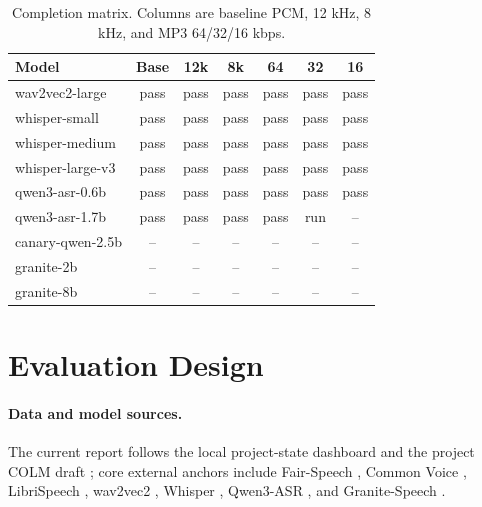 \documentclass[11pt]{article}
\newcommand{\ok}{\textcolor{good}{pass}}
\newcommand{\run}{\textcolor{warn}{run}}
\newcommand{\pend}{\textcolor{muted}{--}}
\begin{document}
\begin{table}[t]
\centering
\scriptsize
\begin{tabular}{@{}lcccccc@{}}
\toprule
Model & Base & 12k & 8k & 64 & 32 & 16 \\
\midrule
wav2vec2-large & \ok & \ok & \ok & \ok & \ok & \ok \\
whisper-small & \ok & \ok & \ok & \ok & \ok & \ok \\
whisper-medium & \ok & \ok & \ok & \ok & \ok & \ok \\
whisper-large-v3 & \ok & \ok & \ok & \ok & \ok & \ok \\
qwen3-asr-0.6b & \ok & \ok & \ok & \ok & \ok & \ok \\
qwen3-asr-1.7b & \ok & \ok & \ok & \ok & \run & \pend \\
canary-qwen-2.5b & \pend & \pend & \pend & \pend & \pend & \pend \\
granite-2b & \pend & \pend & \pend & \pend & \pend & \pend \\
granite-8b & \pend & \pend & \pend & \pend & \pend & \pend \\
\bottomrule
\end{tabular}
\caption{Completion matrix. Columns are baseline PCM, 12 kHz, 8 kHz, and MP3 64/32/16 kbps.}
\label{tab:completion}
\end{table}

\section{Evaluation Design}

\paragraph{Data and model sources.}
The current report follows the local project-state dashboard and the project COLM draft \citep{projectstate2026,ginjala2026listenfairly}; core external anchors include Fair-Speech \citep{veliche2024fairspeech}, Common Voice \citep{ardila2020commonvoice}, LibriSpeech \citep{panayotov2015librispeech}, wav2vec2 \citep{baevski2020wav2vec}, Whisper \citep{radford2023whisper}, Qwen3-ASR \citep{qwen2026asr}, and Granite-Speech \citep{saon2025granite}.
\end{document}
